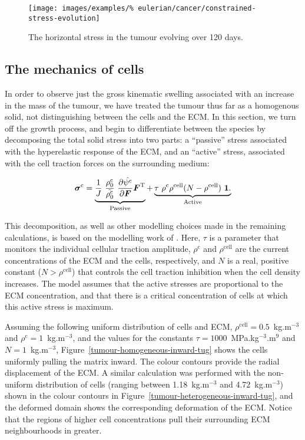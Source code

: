 \begin{figure}[!hptb]
\centering
\texttt{[image: images/examples/\%
eulerian/cancer/constrained-stress-evolution]}
\caption{The horizontal stress in the tumour evolving over 120 days.}
\label{tumour-constrained-stress-evolution}
\end{figure}

\clearpage

\subsection{The mechanics of cells}
\label{cell-roles}

In order to observe just the gross kinematic swelling associated with
an increase in the mass of the tumour, we have treated the tumour thus
far as a homogenous solid, not distinguishing between the cells and
the ECM. In this section, we turn off the growth process, and begin to
differentiate between the species by decomposing the total solid
stress into two parts: a ``passive'' stress associated with the
hyperelastic response of the ECM, and an ``active'' stress, associated
with the cell traction forces on the surrounding medium:

\begin{equation}
\mbox{\boldmath$\sigma$}^{\mathrm{c}} =
\underbrace{\frac{1}{J}\ \frac{\rho_{0}^{\mathrm{c}}}
  {\tilde{\rho_{0}^{\mathrm{c}}}}\    
\frac{\partial \hat{\psi^{\mathrm{c}}}}{\partial
  \mbox{\boldmath$ F$}}  \mbox{\boldmath$ F$}^{\mathrm{T}} }_{\text{Passive}}
+ \underbrace{\tau\ \rho^{\mathrm{c}} \rho^{\mathrm{cell}}
(N - \rho^{\mathrm{cell}})\ {\bf 1}.
}_{\text{Active}}
\label{activepassivesplit}
\end{equation}

\noindent This decomposition, as well as other modelling choices made
in the remaining calculations, is based on the modelling work of
\citet{namyetal:04}. Here, $\tau$ is a parameter that monitors the
individual cellular traction amplitude, $\rho^{\mathrm{c}}$ and
$\rho^{\mathrm{cell}}$ are the current concentrations of the ECM and
the cells, respectively, and $N$ is a real, positive constant
($N>\rho^{\mathrm{cell}}$) that controls the cell traction inhibition
when the cell density increases. The model assumes that the active
stresses are proportional to the ECM concentration, and that there is
a critical concentration of cells at which this active stress is
maximum.

Assuming the following uniform distribution of cells and ECM,
$\rho^{\mathrm{cell}}=0.5$~kg.m$^{-3}$ and
$\rho^{\mathrm{c}}=1$~kg.m$^{-3}$, and the values for the constants
$\tau=1000$~MPa.kg$^{-3}$.m$^{9}$ and $N=1$~kg.m$^{-3}$,
Figure~\ref{tumour-homogeneous-inward-tug} shows the cells uniformly
pulling the matrix inward. The colour contours provide the radial
displacement of the ECM. A similar calculation was performed with the
non-uniform distribution of cells (ranging between 1.18~kg.m$^{-3}$
and 4.72~kg.m$^{-3}$) shown in the colour contours in
Figure~\ref{tumour-heterogeneous-inward-tug}, and the deformed domain
shows the corresponding deformation of the ECM. Notice that the
regions of higher cell concentrations pull their surrounding ECM
neighbourhoods in greater.

